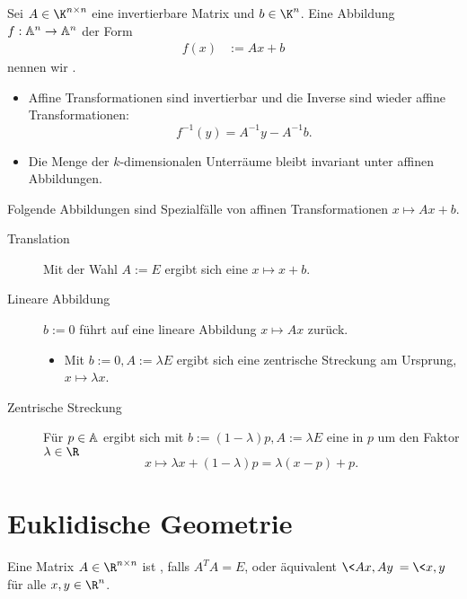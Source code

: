 \begin{df}
	Sei $A \in \K^{n\times n}$ eine invertierbare Matrix und $b \in \K^n$.
	Eine Abbildung $f: \mathbb{A}^n \to \mathbb{A}^n$ der Form
	\begin{align*}
		f(x) &:= Ax + b
	\end{align*}
	nennen wir .
	\begin{note}
		\begin{itemize}
			\item
				Affine Transformationen sind invertierbar und die Inverse sind wieder affine Transformationen:
				\[
					f^{-1}(y) = A^{-1} y  - A^{-1} b.
				\]
			\item
				Die Menge der $k$-dimensionalen Unterräume bleibt invariant unter affinen Abbildungen.
		\end{itemize}
	\end{note}
\end{df}

\begin{ex}
	Folgende Abbildungen sind Spezialfälle von affinen Transformationen $x \mapsto Ax + b$.
	\begin{description}
		\item[Translation]
			Mit der Wahl $A := E$ ergibt sich eine  $x \mapsto x + b$.
		\item[Lineare Abbildung]
			$b := 0$ führt auf eine lineare Abbildung $x \mapsto Ax$ zurück.
			\begin{itemize}
				\item
					Mit $b := 0, A := \lambda E$ ergibt sich eine zentrische Streckung am Ursprung, $x \mapsto \lambda x$.
			\end{itemize}
		\item[Zentrische Streckung]
			Für $p \in \mathbb{A}$ ergibt sich mit $b := (1 - \lambda) p, A := \lambda E$ eine  in $p$ um den Faktor $\lambda \in \R$
			\[
				x \mapsto \lambda x + (1 - \lambda) p = \lambda (x - p) + p.
			\]
	\end{description}
\end{ex}


\section{Euklidische Geometrie}

\begin{df}
	Eine Matrix $A \in \R^{n\times n}$ ist , falls $A^T A = E$, oder äquivalent $\<Ax, Ay\> = \<x, y\>$ für alle $x, y \in \R^n$.
\end{df}

